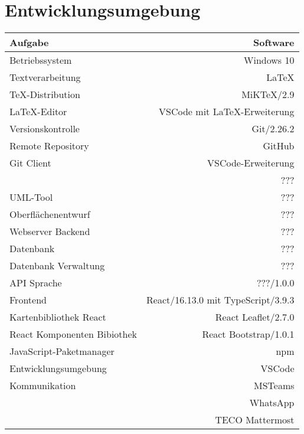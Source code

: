 \section{Entwicklungsumgebung}

\begin{tabular}[htb]{l|r}
    Aufgabe & Software\\
    \hline \hline
    Betriebssystem & Windows 10\\
    \hline
    Textverarbeitung & \LaTeX\\
    TeX-Distribution & MiKTeX/2.9\\
    \LaTeX -Editor & VSCode mit \LaTeX -Erweiterung\\
    \hline
    Versionskontrolle & Git/2.26.2\\
    Remote Repository & GitHub\\
    Git Client & VSCode-Erweiterung\\
    & ???\\
    UML-Tool & ???\\
    Oberflächenentwurf & ???\\
    \hline
    Webserver Backend & ???\\
    Datenbank & ???\\
    Datenbank Verwaltung & ???\\
    API Sprache & ???/1.0.0\\
    \hline
    Frontend & React/16.13.0 mit TypeScript/3.9.3\\
    Kartenbibliothek React & React Leaflet/2.7.0\\
    React Komponenten Bibiothek & React Bootstrap/1.0.1\\
    JavaScript-Paketmanager & npm\\
    Entwicklungsumgebung & VSCode\\
    \hline
    Kommunikation & MSTeams\\
    & WhatsApp\\
    & TECO Mattermost\\
\end{tabular}    
